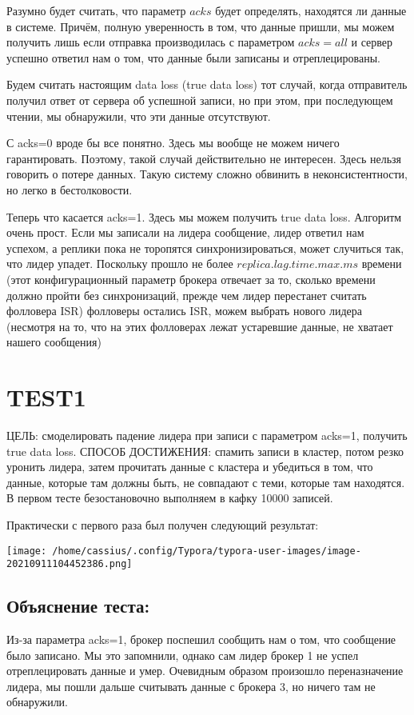 \documentclass[11pt]{article}
\begin{document}
    Разумно будет считать, что параметр $acks$ будет определять, находятся ли данные в системе. Причём, полную уверенность в том, что данные пришли, мы можем получить лишь если отправка производилась с параметром $acks=all$ и сервер успешно ответил нам о том, что данные были записаны и отреплецированы.

    Будем считать настоящим data loss (true data loss) тот случай, когда отправитель получил ответ от сервера об
    успешной записи, но при этом, при последующем чтении, мы обнаружили, что эти данные отсутствуют.

    С acks=0 вроде бы все понятно. Здесь мы вообще не можем ничего гарантировать. Поэтому, такой случай действительно
    не интересен. Здесь нельзя говорить о потере данных. Такую систему сложно обвинить в неконсистентности, но легко в бестолковости.

    Теперь что касается acks=1. Здесь мы можем получить true data loss. Алгоритм очень прост. Если мы записали на
    лидера сообщение, лидер ответил нам успехом, а реплики пока не торопятся синхронизироваться, может случиться так,
    что лидер упадет. Поскольку прошло не более $replica.lag.time.max.ms$ времени (этот конфигурационный параметр
    брокера отвечает за то, сколько времени должно пройти без синхронизаций, прежде чем лидер перестанет считать
    фолловера ISR) фолловеры остались ISR, можем выбрать нового лидера (несмотря на то, что на этих фолловерах лежат
    устаревшие данные, не хватает нашего сообщения)

    \section{TEST1}
    ЦЕЛЬ: смоделировать падение лидера при записи с параметром acks=1, получить true data loss.
    СПОСОБ ДОСТИЖЕНИЯ: спамить записи в кластер, потом резко уронить лидера, затем  прочитать данные с кластера и убедиться в том, что данные, которые там должны быть, не совпадают с теми, которые там находятся.
    В первом тесте безостановочно выполняем в кафку 10000 записей.

    Практически с первого раза был получен следующий результат:

    \texttt{[image: /home/cassius/.config/Typora/typora-user-images/image-20210911104452386.png]}

    \subsection{Объяснение теста:}
    Из-за параметра acks=1, брокер поспешил сообщить нам о том, что сообщение было записано. Мы это запомнили, однако
    сам лидер брокер 1 не успел отреплецировать данные и умер. Очевидным образом произошло переназначение лидера, мы пошли дальше считывать данные с брокера 3, но ничего там не обнаружили.
\end{document}
